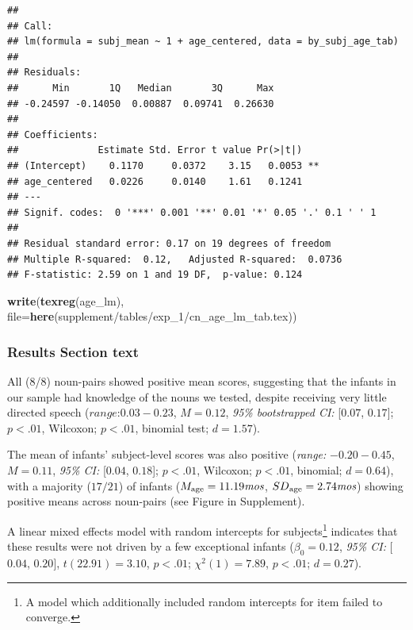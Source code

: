 \documentclass[
  doc,floatsintext]{apa6}
\newenvironment{Shaded}{\begin{snugshade}}{\end{snugshade}}
\newcommand{\AttributeTok}[1]{\textcolor[rgb]{0.13,0.29,0.53}{#1}}
\newcommand{\FunctionTok}[1]{\textcolor[rgb]{0.13,0.29,0.53}{\textbf{#1}}}
\newcommand{\NormalTok}[1]{#1}
\newcommand{\StringTok}[1]{\textcolor[rgb]{0.31,0.60,0.02}{#1}}
\begin{document}
\begin{verbatim}
## 
## Call:
## lm(formula = subj_mean ~ 1 + age_centered, data = by_subj_age_tab)
## 
## Residuals:
##      Min       1Q   Median       3Q      Max 
## -0.24597 -0.14050  0.00887  0.09741  0.26630 
## 
## Coefficients:
##              Estimate Std. Error t value Pr(>|t|)   
## (Intercept)    0.1170     0.0372    3.15   0.0053 **
## age_centered   0.0226     0.0140    1.61   0.1241   
## ---
## Signif. codes:  0 '***' 0.001 '**' 0.01 '*' 0.05 '.' 0.1 ' ' 1
## 
## Residual standard error: 0.17 on 19 degrees of freedom
## Multiple R-squared:  0.12,   Adjusted R-squared:  0.0736 
## F-statistic: 2.59 on 1 and 19 DF,  p-value: 0.124
\end{verbatim}

\begin{Shaded}
\begin{Highlighting}[]
\FunctionTok{write}\NormalTok{(}\FunctionTok{texreg}\NormalTok{(age\_lm), }
      \AttributeTok{file=}\FunctionTok{here}\NormalTok{(}\StringTok{\textquotesingle{}supplement/tables/exp\_1/cn\_age\_lm\_tab.tex\textquotesingle{}}\NormalTok{)) }
\end{Highlighting}
\end{Shaded}

\subsubsection{Results Section text}\label{results-section-text}

All (\(8\)/8) noun-pairs showed positive mean scores, suggesting that the infants in our sample had knowledge of the nouns we tested, despite receiving very little directed speech (\(\textit{range:} 0.03-0.23\), \(M=0.12\), \textit{95\% bootstrapped CI:} {[}\(0.07\), \(0.17\){]}; \(p<.01\), Wilcoxon; \(p<.01\), binomial test; \(d=1.57\)).

The mean of infants' subject-level scores was also positive (\textit{range:} \(-0.20-0.45\), \(M=0.11\), \textit{95\% CI:} {[}\(0.04\), \(0.18\){]}; \(p<.01\), Wilcoxon; \(p<.01\), binomial; \(d=0.64\)), with a majority (\(17/21\)) of infants (\(M_\textnormal{age}=11.19\textit{mos}\), \({SD}_\textnormal{age}=2.74\textit{mos}\)) showing positive means across noun-pairs (see Figure in Supplement).

A linear mixed effects model with random intercepts for subjects\footnote{A model which additionally included random intercepts for item failed to converge.} indicates that these results were not driven by a few exceptional infants (\(\beta_0=0.12\), \textit{95\% CI:} {[}\(0.04\), \(0.20\){]},
\(t(22.91)=3.10\),
\(p<.01\); \(\chi^2(1)=7.89\), \(p<.01\); \(d=0.27\)).
\end{document}
